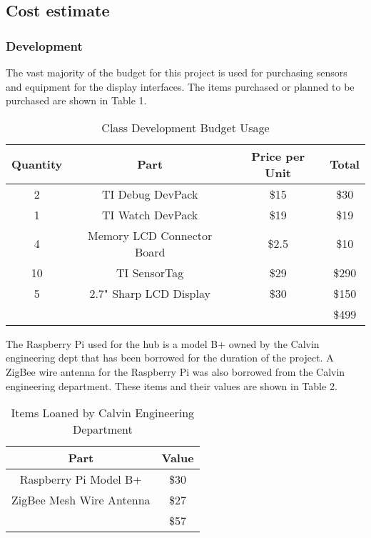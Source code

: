 \documentclass[PPFS.tex]{template/subfiles}
\begin{document}
        
    \subsection{Cost estimate}
        \subsubsection{Development}
        The vast majority of the budget for this project is used for purchasing sensors and equipment for the display interfaces. The items purchased or planned to be purchased are shown in Table 1.
        \begin{table}[h!]
        	\begin{center}
        		\caption{Class Development Budget Usage}
        		\label{tab:table1}
        		\begin{tabular}{|c|c|c|c|}
        			\hline
        			Quantity & Part & Price per Unit & Total\\
        			\hline
        			2 & TI Debug DevPack & \$15 & \$30\\
        			\hline
        			1 & TI Watch DevPack & \$19 & \$19\\
        			\hline
        			4 & Memory LCD Connector Board & \$2.5 & \$10\\
        			\hline
        			10 & TI SensorTag & \$29 & \$290\\
        			\hline
        			5 & 2.7" Sharp LCD Display & \$30 & \$150\\
        			\hline
        			&&& \$499\\
        			\hline
        		\end{tabular}
        	\end{center}
        \end{table}
        
        The Raspberry Pi used for the hub is a model B+ owned by the Calvin engineering dept that has been borrowed for the duration of the project. A ZigBee wire antenna for the Raspberry Pi was also borrowed from the Calvin engineering department. These items and their values are shown in Table 2.
        
        \begin{table}[h!]
        	\begin{center}
        		\caption{Items Loaned by Calvin Engineering Department}
        		\label{tab:table2}
        		\begin{tabular}{|c|c|}
        			\hline
        			Part & Value\\
        			\hline
        			Raspberry Pi Model B+ & \$30 \\
        			\hline
        			ZigBee Mesh Wire Antenna & \$27 \\
        			\hline
        			& \$57\\
        			\hline
        		\end{tabular}
        	\end{center}
        \end{table}
\end{document}
